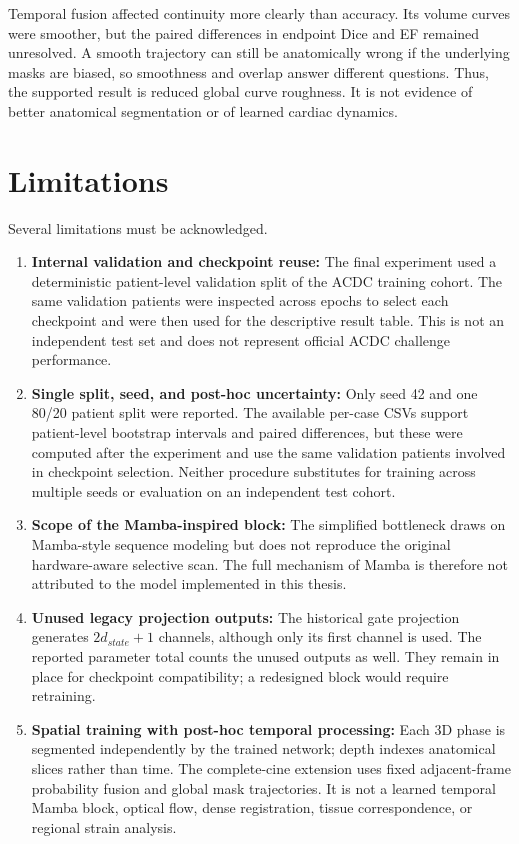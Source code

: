 Temporal fusion affected continuity more clearly than accuracy. Its volume curves were smoother, but the paired differences in endpoint Dice and EF remained unresolved. A smooth trajectory can still be anatomically wrong if the underlying masks are biased, so smoothness and overlap answer different questions. Thus, the supported result is reduced global curve roughness. It is not evidence of better anatomical segmentation or of learned cardiac dynamics.

\section{Limitations}
Several limitations must be acknowledged.

\begin{enumerate}
    \item \textbf{Internal validation and checkpoint reuse:} The final experiment used a deterministic patient-level validation split of the ACDC training cohort. The same validation patients were inspected across epochs to select each checkpoint and were then used for the descriptive result table. This is not an independent test set and does not represent official ACDC challenge performance.
    \item \textbf{Single split, seed, and post-hoc uncertainty:} Only seed 42 and one 80/20 patient split were reported. The available per-case CSVs support patient-level bootstrap intervals and paired differences, but these were computed after the experiment and use the same validation patients involved in checkpoint selection. Neither procedure substitutes for training across multiple seeds or evaluation on an independent test cohort.
    \item \textbf{Scope of the Mamba-inspired block:} The simplified bottleneck draws on Mamba-style sequence modeling but does not reproduce the original hardware-aware selective scan. The full mechanism of Mamba is therefore not attributed to the model implemented in this thesis.
    \item \textbf{Unused legacy projection outputs:} The historical gate projection generates $2d_{state}+1$ channels, although only its first channel is used. The reported parameter total counts the unused outputs as well. They remain in place for checkpoint compatibility; a redesigned block would require retraining.
    \item \textbf{Spatial training with post-hoc temporal processing:} Each 3D phase is segmented independently by the trained network; depth indexes anatomical slices rather than time. The complete-cine extension uses fixed adjacent-frame probability fusion and global mask trajectories. It is not a learned temporal Mamba block, optical flow, dense registration, tissue correspondence, or regional strain analysis.

\end{enumerate}
